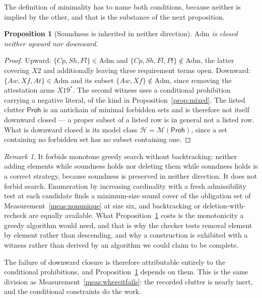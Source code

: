 \documentclass[11pt,reqno]{amsart}
\theoremstyle{plain}
\newtheorem{proposition}[theorem]{Proposition}
\theoremstyle{definition}
\theoremstyle{remark}
\newtheorem{remark}[theorem]{Remark}
\newcommand{\Admf}{\mathrm{Adm}}
\newcommand{\Haz}{\mathsf{Proh}}
\begin{document}
The definition of minimality has to name both conditions, because neither is
implied by the other, and that is the substance of the next proposition.

\begin{proposition}[Soundness is inherited in neither direction]\label{prop:neither}
$\Admf$ is closed neither upward nor downward.
\end{proposition}

\begin{proof}
Upward: $\{Cp,Sh,Fl\} \in \Admf$ and $\{Cp,Sh,Fl,Pl\} \notin \Admf$, the latter
covering $X2$ and additionally leaving three requirement terms open. Downward:
$\{Aw,Xf,At\} \in \Admf$ and its subset $\{Aw,Xf\} \notin \Admf$, since removing
the attestation arms $X19^{*}$. The second witness uses a conditional
prohibition carrying a negative literal, of the kind in
Proposition~\ref{prop:mixed}. The listed clutter $\Haz$ is an antichain of
minimal forbidden sets and is therefore not itself downward closed --- a proper
subset of a listed row is in general not a listed row. What is downward closed
is its model class $\mathcal{H} = \mathcal{M}(\Haz)$, since a set containing no
forbidden set has no subset containing one.
\end{proof}

\begin{remark}
It forbids monotone greedy search without backtracking: neither adding elements
while soundness holds nor deleting them while soundness holds is a correct
strategy, because soundness is preserved in neither direction. It does not
forbid search. Enumeration by increasing cardinality with a fresh admissibility
test at each candidate finds a minimum-size sound cover of the obligation set of
Measurement~\ref{meas:nonunique} at size six, and backtracking or
deletion-with-recheck are equally available. What Proposition~\ref{prop:neither}
costs is the monotonicity a greedy algorithm would need, and that is why the
checker tests removal element by element rather than descending, and why a
construction is exhibited with a witness rather than derived by an algorithm we
could claim to be complete.
\end{remark}

The failure of downward closure is therefore attributable entirely to the
conditional prohibitions, and Proposition~\ref{prop:neither} depends on them.
This is the same division as Measurement~\ref{meas:whereitfails}: the recorded
clutter is nearly inert, and the conditional constraints do the work.
\end{document}
